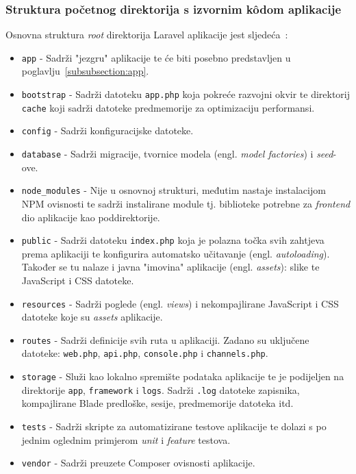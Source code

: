 \subsubsection{Struktura početnog direktorija s izvornim k\^odom aplikacije}
Osnovna struktura \textit{root} direktorija Laravel aplikacije jest sljedeća~\cite{structure}:  \\

\begin{itemize}
\item \texttt{app} - Sadrži "jezgru" aplikacije te će biti posebno predstavljen u poglavlju~\ref{subsubsection:app}.
\item \texttt{bootstrap} - Sadrži datoteku \texttt{app.php} koja pokreće razvojni okvir te direktorij \texttt{cache} koji sadrži datoteke predmemorije za optimizaciju performansi.
\item \texttt{config} - Sadrži konfiguracijske datoteke.
\item \texttt{database} - Sadrži migracije, tvornice modela (engl. \textit{model factories}) i \textit{seed}-ove.
\item \texttt{node\_modules} - Nije u osnovnoj strukturi, međutim nastaje instalacijom NPM ovisnosti te sadrži instalirane module tj. biblioteke potrebne za \textit{frontend} dio aplikacije kao poddirektorije.
\item \texttt{public} - Sadrži datoteku \texttt{index.php} koja je polazna točka svih zahtjeva prema aplikaciji te konfigurira automatsko učitavanje (engl. \textit{autoloading}).  Također se tu nalaze i javna "imovina" aplikacije (engl. \textit{assets}): slike te JavaScript i CSS datoteke.
\item \texttt{resources} - Sadrži poglede (engl. \textit{views}) i nekompajlirane JavaScript i CSS datoteke koje su \textit{assets} aplikacije.
\item \texttt{routes} - Sadrži definicije svih ruta u aplikaciji. Zadano su uključene datoteke: \texttt{web.php}, \texttt{api.php}, \texttt{console.php} i \texttt{channels.php}.
\item \texttt{storage} - Služi kao lokalno spremište podataka aplikacije te je podijeljen na direktorije \texttt{app}, \texttt{framework} i \texttt{logs}. Sadrži \texttt{.log} datoteke zapisnika, kompajlirane Blade predloške, sesije, predmemorije datoteka itd.
\item \texttt{tests} - Sadrži skripte za automatizirane testove aplikacije te dolazi s po jednim oglednim primjerom \textit{unit} i \textit{feature} testova.
\item \texttt{vendor} - Sadrži preuzete Composer ovisnosti aplikacije.
\end{itemize}

